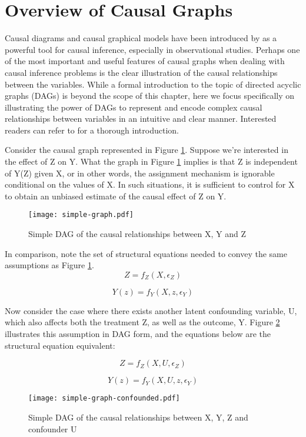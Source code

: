\section{Overview of Causal Graphs}
\label{sec:graph-overview}

Causal diagrams and causal graphical models have been introduced by \citet{pearl_causality_2000} as a powerful tool for causal inference, especially in observational studies.
Perhaps one of the most important and useful features of causal
graphs when dealing with causal inference problems is the clear illustration
of the causal relationships between the variables.
While a formal introduction to the topic of directed acyclic graphs (DAGs) is beyond the scope of this chapter,
here we focus specifically on illustrating the power of DAGs to represent
and encode complex  causal relationships between variables in an intuitive and
clear manner.
Interested readers can refer to \citet{pearl_causality_2000} for a thorough introduction.

Consider the causal graph represented in Figure \ref{fig:simple-graph}.
Suppose we're interested in the effect of Z on Y.
What the graph in Figure \ref{fig:simple-graph} implies is that Z is
independent of Y(Z) given X, or in other words, the assignment mechanism is
ignorable conditional on the values of X.
In such situations, it is sufficient to control for
X to obtain an unbiased estimate of the causal effect of Z on Y.

\begin{figure}[h!]
   \centering
   \texttt{[image: simple-graph.pdf]}
   \caption{Simple DAG of the causal relationships between X, Y and Z}
   \label{fig:simple-graph}
\end{figure}

In comparison, note the set of structural equations needed to convey the same assumptions as Figure \ref{fig:simple-graph}.
\[Z = f_Z(X, \epsilon_Z)  \]

\[Y(z) = f_Y(X, z, \epsilon_Y)  \]

Now consider the case where there exists another latent confounding variable, U, which also affects both the treatment Z, as well as the outcome, Y.
Figure \ref{fig:simple-graph-confounded} illustrates this assumption in DAG form, and the equations below are the structural equation equivalent:

\[Z = f_Z(X, U, \epsilon_Z)  \]

\[Y(z) = f_Y(X, U, z, \epsilon_Y)  \]

\begin{figure}[h!]
   \centering
   \texttt{[image: simple-graph-confounded.pdf]}
   \caption{Simple DAG of the causal relationships between X, Y, Z and confounder U}
   \label{fig:simple-graph-confounded}
\end{figure}

